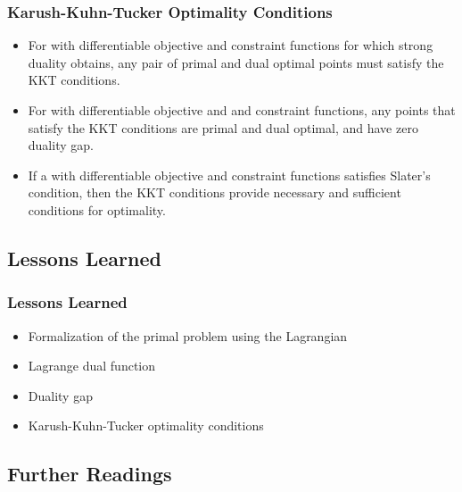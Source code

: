 \begin{frame}
  \frametitle{Karush-Kuhn-Tucker Optimality Conditions \cont}


  \begin{itemize}
    \item For  with differentiable objective and constraint functions for which strong duality obtains, any pair of primal and dual optimal points must satisfy the KKT conditions. \\[.2cm] \pause
    \item For  with differentiable objective and and constraint functions, any points that satisfy the KKT conditions are primal and dual optimal, and have zero duality gap. \\[.2cm] \pause
    \item If a  with differentiable objective and constraint functions satisfies Slater's condition, then the KKT conditions provide necessary and sufficient conditions for optimality.
  \end{itemize}
\end{frame}


\subsection{Lessons Learned}

\begin{frame}
  \frametitle{Lessons Learned}
  
  \begin{itemize}
    \item Formalization of the primal problem using the Lagrangian \\[.5cm]
    \item Lagrange dual function \\[.5cm]
    \item Duality gap \\[.5cm]
    \item Karush-Kuhn-Tucker optimality conditions
  \end{itemize}
\end{frame}



\subsection{Further Readings}

